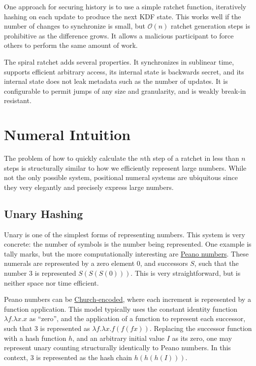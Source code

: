 \documentclass{article}
\begin{document}
    One approach for securing history is to use a simple ratchet function, iteratively hashing on each update to produce the next KDF state. This works well if the number of changes to synchronize is small, but $\mathcal{O}(n)$ ratchet generation steps is prohibitive as the difference grows. It allows a malicious participant to force others to perform the same amount of work.
    
    The spiral ratchet adds several properties. It synchronizes in sublinear time, supports efficient arbitrary access, its internal state is backwards secret, and its internal state does not leak metadata such as the number of updates. It is configurable to permit jumps of any size and granularity, and is weakly break-in resistant.
    
    \section{Numeral Intuition}
    
    The problem of how to quickly calculate the $n$th step of a ratchet in less than $n$ steps is structurally similar to how we efficiently represent large numbers. While not the only possible system, positional numeral systems are ubiquitous since they very elegantly and precisely express large numbers.
    
    \subsection{Unary Hashing}
   
    Unary is one of the simplest forms of representing numbers. This system is very concrete: the number of symbols is the number being represented. One example is tally marks, but the more computationally interesting are \href{https://en.wikipedia.org/wiki/Peano_axioms#Arithmetic}{Peano numbers}. These numerals are represented by a zero element 0, and successors $S$, such that the number 3 is represented $S(S(S(0)))$. This is very straightforward, but is neither space nor time efficient. 
    
	Peano numbers can be \href{https://en.wikipedia.org/wiki/Church_encoding}{Church-encoded}, where each increment is represented by a function application. This model typically uses the constant identity function $\lambda{f}.\lambda{x}.x$ as ``zero'', and the application of a function to represent each successor, such that 3 is represented as $\lambda{f}.\lambda{x}.f(f(f x))$. Replacing the successor function with a hash function $h$, and an arbitrary initial value $I$ as its zero, one may represent unary counting structurally identically to Peano numbers. In this context, 3 is represented as the hash chain $h(h(h(I)))$.
	
\end{document}
